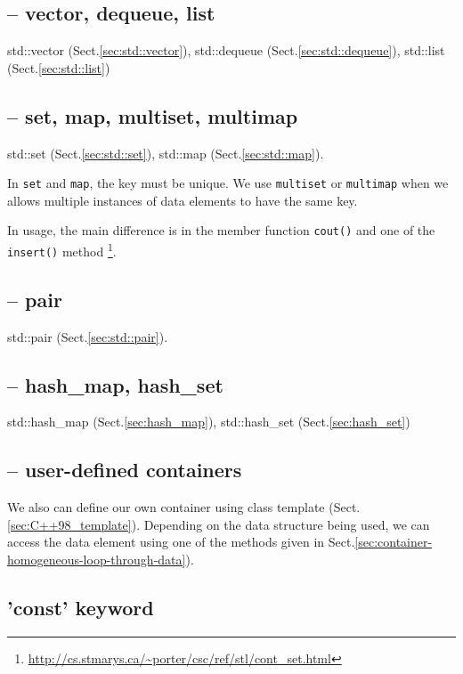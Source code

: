 \subsection{-- vector, dequeue, list}
\label{sec:container_sequence-C++98}

std::vector (Sect.\ref{sec:std::vector}), std::dequeue
(Sect.\ref{sec:std::dequeue}), std::list (Sect.\ref{sec:std::list})

\subsection{-- set, map, multiset, multimap}
\label{sec:container_associative-C++98}

std::set (Sect.\ref{sec:std::set}), std::map (Sect.\ref{sec:std::map}).

In \verb!set! and \verb!map!, the key must be unique.  We use \verb!multiset! or
\verb!multimap! when we allows multiple instances of data elements to have the
same key. 

In usage, the main difference is in the member function \verb!cout()! and one of
the \verb!insert()! method
\footnote{\url{http://cs.stmarys.ca/~porter/csc/ref/stl/cont_set.html}}.

\subsection{-- pair}

std::pair (Sect.\ref{sec:std::pair}).

\subsection{-- hash\_map, hash\_set}

std::hash\_map (Sect.\ref{sec:hash_map}), std::hash\_set
(Sect.\ref{sec:hash_set})


\subsection{-- user-defined containers}

We also can define our own container using class template
(Sect.\ref{sec:C++98_template}). Depending on the data
structure being used, we can access the data element using one of the
methods given in Sect.\ref{sec:container-homogeneous-loop-through-data}).

\subsection{'const' keyword}
\label{sec:const_C++}

